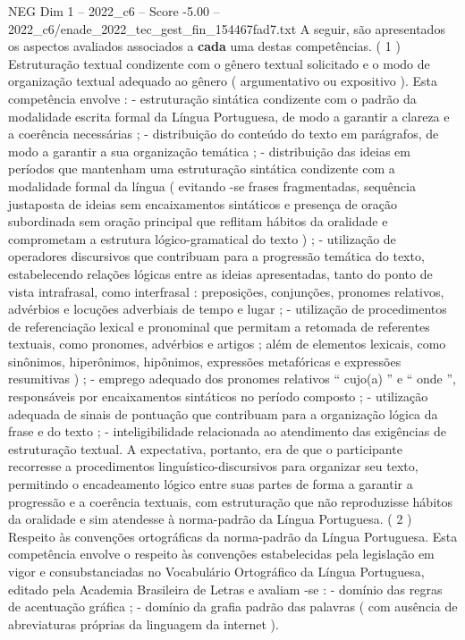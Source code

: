 \begin{textsample}{NEG Dim 1 – 2022\_c6 – Score -5.00 – 2022\_c6/enade\_2022\_tec\_gest\_fin\_154467fad7.txt}
A seguir, são apresentados os aspectos avaliados associados a \textbf{cada} uma destas competências. ( 1 ) Estruturação textual condizente com o gênero textual solicitado e o modo de organização textual adequado ao gênero ( argumentativo ou expositivo ).
Esta competência envolve : - estruturação sintática condizente com o padrão da modalidade escrita formal da Língua Portuguesa, de modo a garantir a clareza e a coerência necessárias ; - distribuição do conteúdo do texto em parágrafos, de modo a garantir a sua organização temática ; - distribuição das ideias em períodos que mantenham uma estruturação sintática condizente com a modalidade formal da língua ( evitando -se frases fragmentadas, sequência justaposta de ideias sem encaixamentos sintáticos e presença de oração subordinada sem oração principal que reflitam hábitos da oralidade e comprometam a estrutura lógico-gramatical do texto ) ; - utilização de operadores discursivos que contribuam para a progressão temática do texto, estabelecendo relações lógicas entre as ideias apresentadas, tanto do ponto de vista intrafrasal, como interfrasal : preposições, conjunções, pronomes relativos, advérbios e locuções adverbiais de tempo e lugar ; - utilização de procedimentos de referenciação lexical e pronominal que permitam a retomada de referentes textuais, como pronomes, advérbios e artigos ; além de elementos lexicais, como sinônimos, hiperônimos, hipônimos, expressões metafóricas e expressões resumitivas ) ; - emprego adequado dos pronomes relativos “ cujo(a) ” e “ onde ”, responsáveis por encaixamentos sintáticos no período composto ; - utilização adequada de sinais de pontuação que contribuam para a organização lógica da frase e do texto ; - inteligibilidade relacionada ao atendimento das exigências de estruturação textual.
A expectativa, portanto, era de que o participante recorresse a procedimentos linguístico-discursivos para organizar seu texto, permitindo o encadeamento lógico entre suas partes de forma a garantir a progressão e a coerência textuais, com estruturação que não reproduzisse hábitos da oralidade e sim atendesse à norma-padrão da Língua Portuguesa. ( 2 ) Respeito às convenções ortográficas da norma-padrão da Língua Portuguesa.
Esta competência envolve o respeito às convenções estabelecidas pela legislação em vigor e consubstanciadas no Vocabulário Ortográfico da Língua Portuguesa, editado pela Academia Brasileira de Letras e avaliam -se : - domínio das regras de acentuação gráfica ; - domínio da grafia padrão das palavras ( com ausência de abreviaturas próprias da linguagem da internet ).

\end{textsample}
